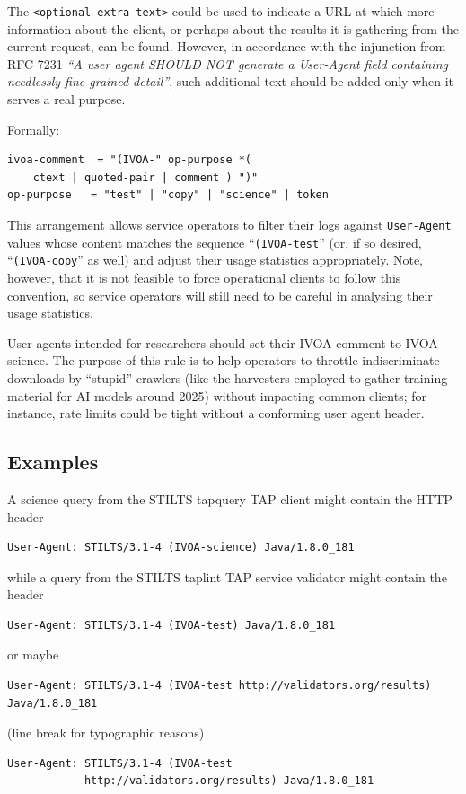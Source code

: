 \documentclass[11pt,a4paper]{ivoa}
\newcommand{\headername}[1]{{\tt #1}}
\begin{document}
The \verb|<optional-extra-text>| could be used to indicate a URL at which
more information about the client, or perhaps about the results it is
gathering from the current request, can be found.
However, in accordance with the injunction from RFC 7231
{\em ``A user agent SHOULD NOT generate a User-Agent field containing
needlessly fine-grained detail''},
such additional text should be added only when it serves a real purpose.

Formally:

\begin{verbatim}
ivoa-comment  = "(IVOA-" op-purpose *(
    ctext | quoted-pair | comment ) ")"
op-purpose   = "test" | "copy" | "science" | token
\end{verbatim}

This arrangement allows service operators to filter their logs against
\headername{User-Agent} values
whose content matches the sequence ``\verb|(IVOA-test|'' (or, if so
desired,
``\verb|(IVOA-copy|'' as well) and adjust their usage statistics
appropriately. Note, however, that it is not feasible to force operational
clients to follow this convention, so service operators will still need
to be careful in analysing their usage statistics.

User agents intended for researchers should set their IVOA comment to
IVOA-science.  The purpose of this rule is to help operators to throttle
indiscriminate downloads by ``stupid'' crawlers (like the harvesters
employed to gather training material for AI models around 2025) without
impacting common clients; for instance, rate limits could be tight
without a conforming user agent header.

\subsection{Examples}

A science query from the STILTS tapquery TAP client might contain the
HTTP header
\begin{verbatim}
User-Agent: STILTS/3.1-4 (IVOA-science) Java/1.8.0_181
\end{verbatim}
while a query from the STILTS taplint TAP service validator might
contain the header
\begin{verbatim}
User-Agent: STILTS/3.1-4 (IVOA-test) Java/1.8.0_181
\end{verbatim}
or maybe
\iftth
\begin{verbatim}
User-Agent: STILTS/3.1-4 (IVOA-test http://validators.org/results) Java/1.8.0_181
\end{verbatim}
\else
(line break for typographic reasons)
\begin{verbatim}
User-Agent: STILTS/3.1-4 (IVOA-test
            http://validators.org/results) Java/1.8.0_181
\end{verbatim}
\fi
\end{document}
